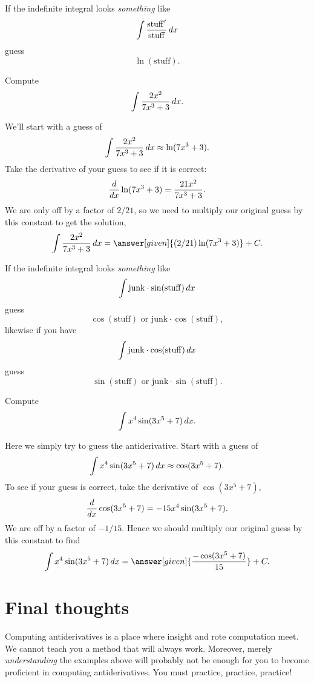 \documentclass{ximera}
\begin{document}
\begin{template}\label{template:lnchain}
If the indefinite integral looks \emph{something} like
\[
\int \frac{\mathrm{stuff}'}{\mathrm{stuff}}\,d x
\]
guess
\[
\ln(\mathrm{stuff}).
\]
\end{template}

\begin{example}
Compute
\[
\int \frac{2x^2}{7x^3 + 3} \,d x.
\]
\begin{explanation}
We'll start with a guess of
\[
\int \frac{2x^2}{7x^3 + 3} \,d x \approx \ln(7x^3+3).
\]
Take the derivative of your guess to see if it is correct:
\[
\frac{d}{dx} \ln(7x^3+3) = \frac{21x^2}{7x^3 + 3}.
\]
We are only off by a factor of $2/21$, so we need to multiply our
original guess by this constant to get the solution,
\[
\int \frac{2x^2}{7x^3 + 3} \d x = \answer[given]{(2/21)\ln(7x^3+3)}+C.
\]
\end{explanation}
\end{example}




\begin{template}\label{template:trigchain}
If the indefinite integral looks \emph{something} like
\[
\int \mathrm{junk}\cdot \sin(\mathrm{stuff}) \,d x
\]
guess
\[
\cos(\mathrm{stuff}) \text{ or }\mathrm{junk}\cdot \cos(\mathrm{stuff}),
\]
likewise if you have 
\[
\int \mathrm{junk}\cdot \cos(\mathrm{stuff}) \,d x
\]
guess
\[
\sin(\mathrm{stuff}) \text{ or }\mathrm{junk}
\cdot \sin(\mathrm{stuff}).
\]
\end{template}



\begin{example}
Compute
\[
\int x^4\sin(3x^5+7) \,d x.
\]
\begin{explanation}
Here we simply try to guess the antiderivative. Start with a guess of
\[
\int x^4\sin(3x^5+7)\,d x \approx \cos(3x^5+7).
\]
To see if your guess is correct, take the derivative of $\cos(3x^5+7)$,
\[
\frac{d}{dx} \cos(3x^5+7) = -15x^4\sin(3x^5+7).
\]
We are off by a factor of $-1/15$. Hence we should multiply our
original guess by this constant to find
\[
\int x^4\sin(3x^5+7) \d x = \answer[given]{\frac{-\cos(3x^5+7)}{15}} + C.
\]
\end{explanation}
\end{example}





\section{Final thoughts}
Computing antiderivatives is a place where insight and rote
computation meet. We cannot teach you a method that will always
work. Moreover, merely \emph{understanding} the examples above will
probably not be enough for you to become proficient in computing
antiderivatives. You must practice, practice, practice!
\end{document}
